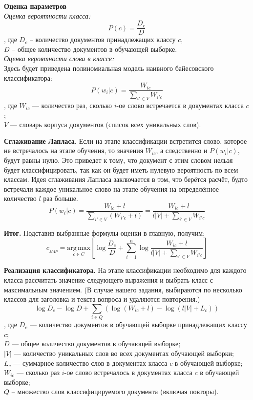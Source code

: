 \textbf{Оценка параметров} \\
\textit{Оценка вероятности класса:}
$$ P(c) = \frac{D_c}{D} $$
, где $D_c$ – количество документов принадлежащих классу $c$, \\
$D$ – общее количество документов в обучающей выборке. \\
\textit{Оценка вероятности слова в классе:} \\
Здесь будет приведена полиномиальная модель наивного байесовского классификатора:
$$ P(w_i|c) = \frac{W_{ic}}{\sum_{i' \in V} W_{i'c}} $$
, где $W_{ic}$ — количество раз, сколько $i$-ое слово встречается в документах класса $c$; \\
$V$ — словарь корпуса документов (список всех уникальных слов).

\textbf{Сглаживание Лапласа.} Если на этапе классификации встретится слово, которое не встречалось на этапе обучения, то значения $W_{ic}$, а следственно и $P(w_i|c)$, будут равны нулю. Это приведет к тому, что документ с этим словом нельзя будет классифицировать, так как он будет иметь нулевую вероятность по всем классам. Идея сглаживания Лапласа заключается в том, что берётся расчёт, будто встречали каждое уникальное слово на этапе обучения на определённое количество $l$ раз больше.
$$ P(w_i|c) = \frac{W_{ic} + l}{\sum_{i' \in V} \left(W_{i'c} + l\right)} = \frac{W_{ic} + l}{l\left|V\right| + \sum_{i' \in V} W_{i'c}} $$

\textbf{Итог.} Подставив выбранные формулы оценки в главную, получим:
$$ c_{_{MAP}} = \underset{c \in C}{\mathrm{arg\,max}} \left[\log \frac{D_c}{D} + \sum^n_{i=1}\log \frac{W_{ic} + l}{l\left|V\right| + \sum_{i' \in V} W_{i'c}} \right] $$

\textbf{Реализация классификатора.} На этапе классификации необходимо для каждого класса рассчитать значение следующего выражения и выбрать класс с максимальным значением. (В случае нашего задания, выбираются по несколько классов для заголовка и текста вопроса и удаляются повторения.)
$$ \log D_c - \log D + \sum_{i \in Q}\left( \log\left(W_{ic} + l\right) - \log\left(l\left|V\right| + L_c \right) \right) $$
, где $D_c$ — количество документов в обучающей выборке принадлежащих классу $c$; \\
$D$ — общее количество документов в обучающей выборке; \\
$|V|$ — количество уникальных слов во всех документах обучающей выборки; \\
$L_{c}$ — суммарное количество слов в документах класса $c$ в обучающей выборке; \\
$W_{ic}$ — сколько раз $i$-ое слово встречалось в документах класса $c$ в обучающей выборке; \\
$Q$ – множество слов классифицируемого документа (включая повторы). \\

